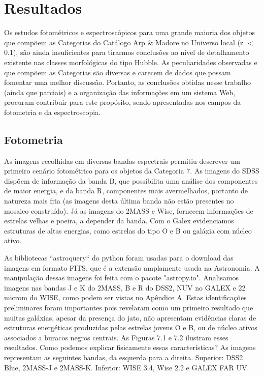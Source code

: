 
\chapter{Resultados}

Os estudos fotométricos e espectroscópicos para uma grande maioria dos objetos que compõem as Categorias do Catálogo Arp \& Madore no Universo local (z $<$ 0.1), são ainda insuficientes para tirarmos conclusões ao nível de detalhamento existente nas classes morfológicas do tipo Hubble. As peculiaridades observadas e que compõem as Categorias são diversas e carecem de dados que possam fomentar uma melhor discussão. Portanto, as conclusões obtidas nesse trabalho (ainda que parciais) e a organização das informações em um sistema Web, procuram contribuir para este propósito, sendo apresentadas nos campos da fotometria e da espectroscopia.

\section{Fotometria}

As imagens recolhidas em diversas bandas espectrais permitiu descrever um primeiro cenário fotométrico para os objetos da Categoria 7. As imagens do SDSS dispõem de informação da banda B, que possibilita uma análise dos componentes de maior energia, e da banda R, componentes mais avermelhados, portanto de natureza mais fria (as imagens desta última banda não estão presentes no mosaico construído). Já as imagens do 2MASS e Wise, fornecem informações de estrelas velhas e poeira, a depender da banda. Com o Galex evidenciamos estruturas de altas energias, como estrelas do tipo O e B ou
galáxia com núcleo ativo.

As bibliotecas ``astroquery`` do python foram usadas para o download das imagens em formato FITS, que é a extensão amplamente usada na Astronomia. A manipulação dessas imagens foi feita com o pacote "astropy.io". Analisamos imagens nas bandas J e K do 2MASS, B e R do DSS2, NUV no GALEX e 22 microm do WISE, como podem ser vistas no Apêndice A. Estas identificações preliminares foram importantes pois revelaram como um primeiro resultado que muitas galáxias, apesar da presença do jato, não apresentam evidências claras de estruturas energéticas produzidas pelas estrelas jovens O e B, ou de núcleo ativos associados a buracos negros centrais. As Figuras 7.1 e 7.2 ilustram esses resultados. Como podemos explicar fisicamente essas características? As imagens representam as seguintes bandas, da esquerda para a direita. Superior: DSS2 Blue, 2MASS-J e 2MASS-K. Inferior: WISE 3.4, Wise 2.2 e GALEX FAR UV.

